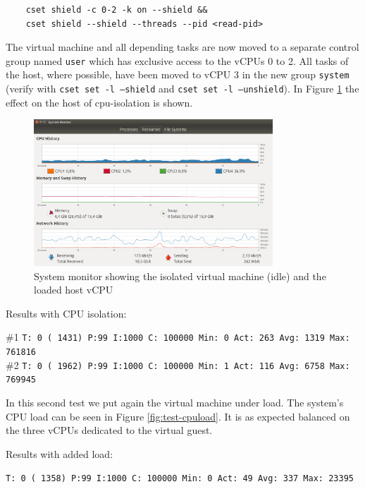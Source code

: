 \documentclass[]{scrartcl}
\begin{document}
\begin{verbatim}
	cset shield -c 0-2 -k on --shield &&
	cset shield --shield --threads --pid <read-pid>
\end{verbatim}

The virtual machine and all depending tasks are now moved to a separate control group named \texttt{user} which has exclusive access to the vCPUs 0 to 2. All tasks of the host, where possible, have been moved to vCPU 3 in the new group \texttt{system} (verify with \texttt{cset set -l --shield} and \texttt{cset set -l --unshield}). In Figure \ref{fig:test-cpu} the effect on the host of cpu-isolation is shown.

\begin{figure}[t]
	\centering
	\includegraphics[width=0.8\textwidth]{test-cpu}
	\caption{System monitor showing the isolated virtual machine (idle) and the loaded host vCPU}
	\label{fig:test-cpu}
\end{figure}

\noindent Results with CPU isolation:

\noindent \small \#1 \texttt{T: 0 ( 1431) P:99 I:1000 C: 100000 Min: 0 Act:  263 Avg: 1319 Max:  761816}\\
\noindent \small \#2 \texttt{T: 0 ( 1962) P:99 I:1000 C: 100000 Min: 1 Act:  116 Avg: 6758 Max:  769945}

In this second test we put again the virtual machine under load. The system's CPU load can be seen in Figure \ref{fig:test-cpuload}. It is as expected balanced on the three vCPUs dedicated to the virtual guest.

\noindent Results with added load: 

\noindent \texttt{T: 0 ( 1358) P:99 I:1000 C: 100000 Min:      0 Act:   49 Avg:  337 Max:   23395}
\end{document}
